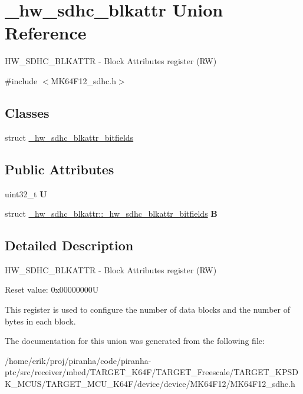 \hypertarget{union__hw__sdhc__blkattr}{}\section{\+\_\+hw\+\_\+sdhc\+\_\+blkattr Union Reference}
\label{union__hw__sdhc__blkattr}


H\+W\+\_\+\+S\+D\+H\+C\+\_\+\+B\+L\+K\+A\+T\+TR -\/ Block Attributes register (RW)  




{\ttfamily \#include $<$M\+K64\+F12\+\_\+sdhc.\+h$>$}

\subsection*{Classes}
\begin{DoxyCompactItemize}
\item 
struct \hyperlink{struct__hw__sdhc__blkattr_1_1__hw__sdhc__blkattr__bitfields}{\+\_\+hw\+\_\+sdhc\+\_\+blkattr\+\_\+bitfields}
\end{DoxyCompactItemize}
\subsection*{Public Attributes}
\begin{DoxyCompactItemize}
\item 
uint32\+\_\+t {\bfseries U}\hypertarget{union__hw__sdhc__blkattr_a573b7661a2678b491713e0645bb76860}{}\label{union__hw__sdhc__blkattr_a573b7661a2678b491713e0645bb76860}

\item 
struct \hyperlink{struct__hw__sdhc__blkattr_1_1__hw__sdhc__blkattr__bitfields}{\+\_\+hw\+\_\+sdhc\+\_\+blkattr\+::\+\_\+hw\+\_\+sdhc\+\_\+blkattr\+\_\+bitfields} {\bfseries B}\hypertarget{union__hw__sdhc__blkattr_a6d3e964d81cecc258754aaf9d542e0bb}{}\label{union__hw__sdhc__blkattr_a6d3e964d81cecc258754aaf9d542e0bb}

\end{DoxyCompactItemize}


\subsection{Detailed Description}
H\+W\+\_\+\+S\+D\+H\+C\+\_\+\+B\+L\+K\+A\+T\+TR -\/ Block Attributes register (RW) 

Reset value\+: 0x00000000U

This register is used to configure the number of data blocks and the number of bytes in each block. 

The documentation for this union was generated from the following file\+:\begin{DoxyCompactItemize}
\item 
/home/erik/proj/piranha/code/piranha-\/ptc/src/receiver/mbed/\+T\+A\+R\+G\+E\+T\+\_\+\+K64\+F/\+T\+A\+R\+G\+E\+T\+\_\+\+Freescale/\+T\+A\+R\+G\+E\+T\+\_\+\+K\+P\+S\+D\+K\+\_\+\+M\+C\+U\+S/\+T\+A\+R\+G\+E\+T\+\_\+\+M\+C\+U\+\_\+\+K64\+F/device/device/\+M\+K64\+F12/M\+K64\+F12\+\_\+sdhc.\+h\end{DoxyCompactItemize}
